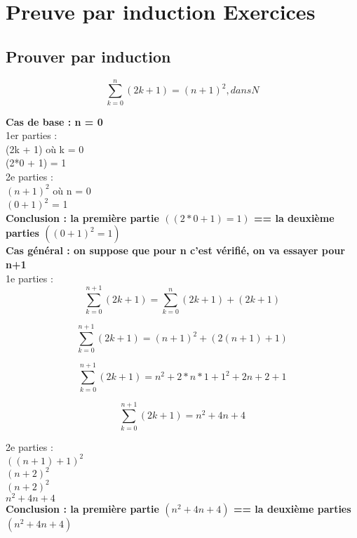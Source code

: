 \newpage

\chapter{Preuve par induction Exercices}
\vspace{5mm} %

\section{Prouver par induction}

\[
  \sum_{k=0}^{n} (2k + 1)= (n+1)^{2}, dans N
\]

\textbf{Cas de base : n = 0} \\

1er parties : \\

(2k + 1) où k = 0 \\
(2*0 + 1) = 1 \\

2e parties : \\

$(n+1)^{2}$ où n = 0 \\
$(0+1)^{2}$ = 1 \\

\textbf{Conclusion : la première partie $((2*0 + 1) = 1)$ == la deuxième parties $((0+1)^{2} = 1)$} \\

\textbf{Cas général : on suppose que pour n c'est vérifié, on va essayer pour n+1 } \\

1e parties : \\

\[
  \sum_{k=0}^{n+1} (2k + 1) =
  \sum_{k=0}^{n} (2k + 1) + (2k+1)
\]

\[
  \sum_{k=0}^{n+1} (2k + 1) = (n+1)^{2} + (2(n+1)+1)
\]

\[
  \sum_{k=0}^{n+1} (2k + 1) = n^{2} + 2*n*1 +1^{2} + 2n + 2 + 1
\]

\[
  \sum_{k=0}^{n+1} (2k + 1) = n^{2} + 4n + 4
\]

2e parties : \\

$((n+1)+1)^{2}$ \\
$(n+2)^{2}$ \\
$(n+2)^{2}$ \\
$n^{2}+4n+4$ \\


\textbf{Conclusion : la première partie $(n^{2}+4n+4)$ == la deuxième parties $(n^{2}+4n+4)$} \\

